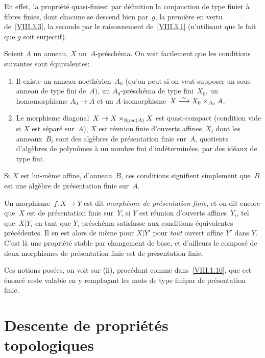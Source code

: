 En effet, la propri\'et\'e \og quasi-fini\fg est par d\'efinition
la conjonction de \og type fini\fg et \og \`a fibres finies\fg, dont
chacune se descend bien par~$g$, la premi\`ere en vertu
de~\ref{VIII.3.3}, la seconde par le raisonnement de~\ref{VIII.3.1}
(n'utilisant que le fait que $g$ soit surjectif).

\begin{remarques}
\label{VIII.3.6}
Soient $A$ un anneau, $X$ un~$A$-pr\'esch\'ema. On voit facilement
que
les conditions suivantes sont \'equivalentes:

\begin{enumerate}
\item[(i)] Il existe un anneau noeth\'erien~$A_{0}$ (qu'on peut si
on veut supposer un sous-anneau de type fini de~$A$), un
$A_{0}$-pr\'esch\'ema de type fini~$X_{0}$, un homomorphisme
$A_0\to A$
et un $A$-isomorphisme~$X\overset{\sim}{\longrightarrow} X_{0}\times_{A_{0}}A$.
\item[(ii)] Le morphisme diagonal~$X\to X\times_{\Spec(A)}X$ est
quasi-compact (condition vide si $X$ est s\'epar\'e sur~$A$), $X$
est r\'eunion finie d'ouverts affines~$X_{i}$ dont les
anneaux~$B_{i}$ sont des alg\`ebres de pr\'esentation finie
sur~$A$, \ie quotients d'alg\`ebres de polyn\^omes \`a un
nombre fini d'ind\'etermin\'ees, par des id\'eaux de type fini.
\end{enumerate}

Si $X$ est lui-m\^eme affine, d'anneau~$B$, ces conditions
signifient simplement que~$B$ est une alg\`ebre de pr\'esentation
finie sur~$A$.

Un morphisme~$f\colon X\to Y$ est dit \emph{morphisme de
présentation finie},
et on dit encore que~$X$ est de pr\'esentation finie sur~$Y$, si $Y$
est r\'eunion d'ouverts affines~$Y_{i}$, tel que~$X|Y_{i}$ en tant
que $Y_{i}$-pr\'esch\'ema satisfasse aux conditions
\'equivalentes pr\'ec\'edentes. Il en est alors de m\^eme pour
$X|Y'$ pour \emph{tout} ouvert affine $Y'$ dans $Y$. C'est l\`a une
propri\'et\'e stable par changement de base, et d'ailleurs le
compos\'e de deux morphismes de pr\'esentation finie est de
pr\'esentation finie.

Ces notions pos\'ees, on voit sur (ii), proc\'edant comme
dans~\ref{VIII.1.10}, que cet \'enonc\'e reste valable en y
rempla\c cant les mots \og de type fini\fg par \og de pr\'esentation
finie\fg.
\end{remarques}

\section{Descente de propri\'et\'es topologiques}
\label{VIII.4}


